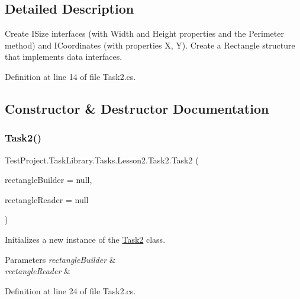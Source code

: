 \subsection{Detailed Description}
Create I\+Size interfaces (with Width and Height properties and the Perimeter method) and I\+Coordinates (with properties X, Y). Create a Rectangle structure that implements data interfaces. 



Definition at line 14 of file Task2.\+cs.



\subsection{Constructor \& Destructor Documentation}
\mbox{\label{class_test_project_1_1_task_library_1_1_tasks_1_1_lesson2_1_1_task2_a0dc2439be966c494ca1b8097df9a803c}} 
\subsubsection{\texorpdfstring{Task2()}{Task2()}}
{\footnotesize\ttfamily Test\+Project.\+Task\+Library.\+Tasks.\+Lesson2.\+Task2.\+Task2 (\begin{DoxyParamCaption}\item[{I\+Builder$<$ \mbox{\hyperlink{struct_test_project_1_1_task_library_1_1_tasks_1_1_lesson2_1_1_models_1_1_rectangle}{Rectangle}} $>$}]{rectangle\+Builder = {\ttfamily null},  }\item[{I\+Reader}]{rectangle\+Reader = {\ttfamily null} }\end{DoxyParamCaption})}



Initializes a new instance of the \mbox{\hyperlink{class_test_project_1_1_task_library_1_1_tasks_1_1_lesson2_1_1_task2}{Task2}} class. 


\begin{DoxyParams}{Parameters}
{\em rectangle\+Builder} & \\
\hline
{\em rectangle\+Reader} & \\
\hline
\end{DoxyParams}


Definition at line 24 of file Task2.\+cs.




